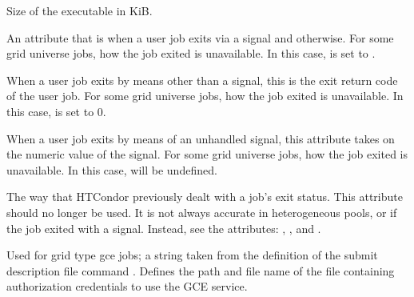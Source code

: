 \begin{description}
\item[\AdAttr{ExecutableSize}:]  Size of the executable in KiB.

\item[\AdAttr{ExitBySignal}:]  An attribute that is 
when a user job exits via a signal and  otherwise.
For some grid universe jobs, how the job exited is
unavailable. In this case,  is set to  .

\item[\AdAttr{ExitCode}:]  When a user job exits by means other than a signal,
this is the exit return code of the user job.
For some grid universe jobs, how the job exited is
unavailable. In this case,  is set to  0.

\item[\AdAttr{ExitSignal}:]  When a user job exits by means of an unhandled 
signal, this attribute takes on the numeric value of the signal.
For some grid universe jobs, how the job exited is
unavailable. In this case,  will be undefined.


\item[\AdAttr{ExitStatus}:]  The way that HTCondor previously dealt with
a job's exit status.
This attribute should no longer be used.
It is not always accurate in
heterogeneous pools, or if the job exited with a signal.
Instead, see the attributes: ,
, and
.

\item[\AdAttr{GceAuthFile}:] 
Used for grid type gce jobs;
a string taken from the definition of the submit description file command
.
Defines the path and file name of the file containing authorization
credentials to use the GCE service.


\end{description}
